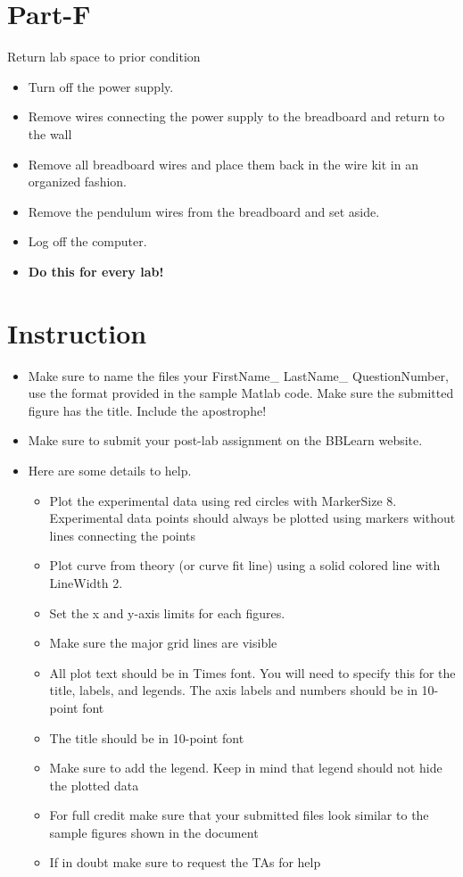 \documentclass{article} %
\begin{document}
\section{Part-F}
Return lab space to prior condition
\begin{itemize}
\item Turn off the power supply.
\item Remove wires connecting the power supply to the breadboard and return to the wall
\item Remove all breadboard wires and place them back in the wire kit in an organized fashion.
\item Remove the pendulum wires from the breadboard and set aside.
\item Log off the computer.
\item {\bf Do this for every lab!}
\end{itemize}


\section{Instruction}
\begin{itemize}
\item Make sure to name the files your FirstName\_ LastName\_ QuestionNumber, use the format provided in the sample Matlab code. Make sure the submitted figure has the title. Include the apostrophe!
\item Make sure to submit your post-lab assignment on the BBLearn website. 
\item Here are some details to help. 
\begin{itemize}
\item Plot  the experimental data using red circles with MarkerSize 8. Experimental data points should always be plotted using markers without lines connecting the points
\item Plot curve from theory (or curve fit line) using a solid colored line with LineWidth 2. 
\item  Set the x and y-axis limits for each figures. 
\item Make sure the major grid lines are visible
\item All plot text should be in Times font. You will need to specify this for the title, labels, and
legends. The axis labels and numbers should be in 10-point font
\item The title should be in 10-point font
\item Make sure to add the legend. Keep in mind that legend should not hide the plotted data
\item For full credit make sure that your submitted files look similar to the sample figures shown in the document
\item If in doubt make sure to request the TAs for help
\end{itemize}
\end{itemize}
\end{document}
